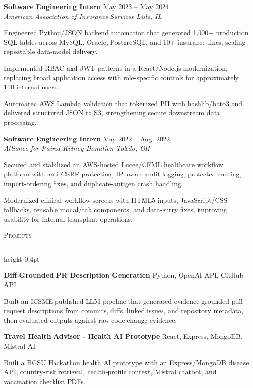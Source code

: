 \documentclass[letterpaper,11pt]{article}
\newcommand{\resumesection}[1]{%
  \par\vspace{2pt}%
  {\large\scshape #1}\par\vspace{2pt}%
  \hrule height 0.4pt\vspace{2pt}%
}
\newcommand{\resumeSubheading}[4]{
  \textbf{#1} \hfill #2\\
  \textit{#3} \hfill \textit{#4}
}
\newcommand{\projectHeading}[2]{
  \textbf{#1} \hfill #2
}
\begin{document}
\resumeSubheading
{Software Engineering Intern}{May 2023 -- May 2024}
{American Association of Insurance Services}{Lisle, IL}
\begin{tightitemize}
  \item Engineered Python/JSON backend automation that generated 1,000+ production SQL tables across MySQL, Oracle, PostgreSQL, and 10+ insurance lines, scaling repeatable data-model delivery.
  \item Implemented RBAC and JWT patterns in a React/Node.js modernization, replacing broad application access with role-specific controls for approximately 110 internal users.
  \item Automated AWS Lambda validation that tokenized PII with hashlib/boto3 and delivered structured JSON to S3, strengthening secure downstream data processing.
\end{tightitemize}

\resumeSubheading
{Software Engineering Intern}{May 2022 -- Aug. 2022}
{Alliance for Paired Kidney Donation}{Toledo, OH}
\begin{tightitemize}
  \item Secured and stabilized an AWS-hosted Lucee/CFML healthcare workflow platform with anti-CSRF protection, IP-aware audit logging, protected routing, import-ordering fixes, and duplicate-antigen crash handling.
  \item Modernized clinical workflow screens with HTML5 inputs, JavaScript/CSS fallbacks, reusable modal/tab components, and data-entry fixes, improving usability for internal transplant operations.
\end{tightitemize}

\resumesection{Projects}
\projectHeading{Diff-Grounded PR Description Generation}{Python, OpenAI API, GitHub API}
\begin{tightitemize}
  \item Built an ICSME-published LLM pipeline that generated evidence-grounded pull request descriptions from commits, diffs, linked issues, and repository metadata, then evaluated outputs against raw code-change evidence.
\end{tightitemize}

\projectHeading{Travel Health Advisor - Health AI Prototype}{React, Express, MongoDB, Mistral AI}
\begin{tightitemize}
  \item Built a BGSU Hackathon health AI prototype with an Express/MongoDB disease API, country-risk retrieval, health-profile context, Mistral chatbot, and vaccination checklist PDFs.
\end{tightitemize}
\end{document}
